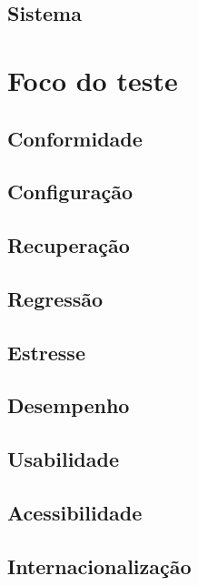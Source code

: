 \documentclass[
	12pt,				%
	openright,			%
	twoside,			%
	a4paper,			%
	english,			%
	brazil,				%
	]{abntex2}
\begin{document}
\subsection{Sistema}

\section{Foco do teste}


\subsection{Conformidade}


\subsection{Configuração}


\subsection{Recuperação}


\subsection{Regressão}


\subsection{Estresse}


\subsection{Desempenho}


\subsection{Usabilidade}


\subsection{Acessibilidade}


\subsection{Internacionalização}
\end{document}
